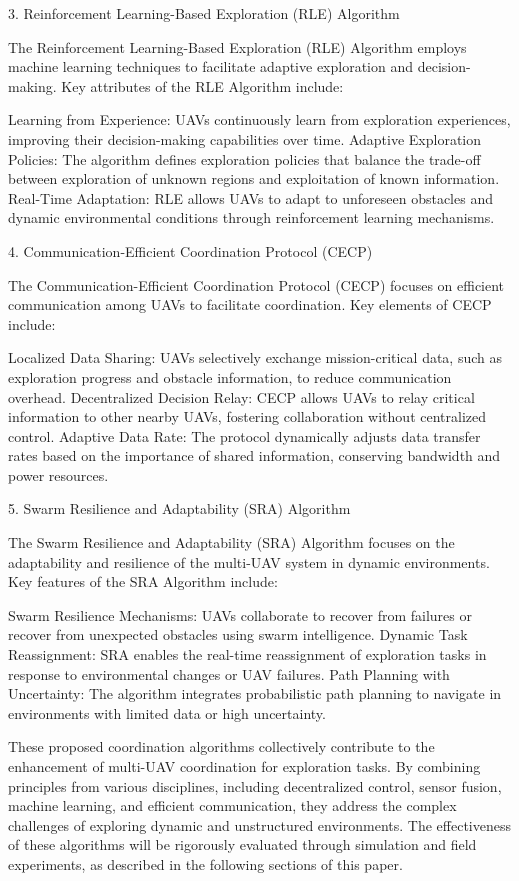 \documentclass[sigconf]{acmart}
\begin{document}
3. Reinforcement Learning-Based Exploration (RLE) Algorithm

The Reinforcement Learning-Based Exploration (RLE) Algorithm employs machine learning techniques to facilitate adaptive exploration and decision-making. Key attributes of the RLE Algorithm include:

    Learning from Experience: UAVs continuously learn from exploration experiences, improving their decision-making capabilities over time.
    Adaptive Exploration Policies: The algorithm defines exploration policies that balance the trade-off between exploration of unknown regions and exploitation of known information.
    Real-Time Adaptation: RLE allows UAVs to adapt to unforeseen obstacles and dynamic environmental conditions through reinforcement learning mechanisms.

4. Communication-Efficient Coordination Protocol (CECP)

The Communication-Efficient Coordination Protocol (CECP) focuses on efficient communication among UAVs to facilitate coordination. Key elements of CECP include:

    Localized Data Sharing: UAVs selectively exchange mission-critical data, such as exploration progress and obstacle information, to reduce communication overhead.
    Decentralized Decision Relay: CECP allows UAVs to relay critical information to other nearby UAVs, fostering collaboration without centralized control.
    Adaptive Data Rate: The protocol dynamically adjusts data transfer rates based on the importance of shared information, conserving bandwidth and power resources.

5. Swarm Resilience and Adaptability (SRA) Algorithm

The Swarm Resilience and Adaptability (SRA) Algorithm focuses on the adaptability and resilience of the multi-UAV system in dynamic environments. Key features of the SRA Algorithm include:

    Swarm Resilience Mechanisms: UAVs collaborate to recover from failures or recover from unexpected obstacles using swarm intelligence.
    Dynamic Task Reassignment: SRA enables the real-time reassignment of exploration tasks in response to environmental changes or UAV failures.
    Path Planning with Uncertainty: The algorithm integrates probabilistic path planning to navigate in environments with limited data or high uncertainty.

These proposed coordination algorithms collectively contribute to the enhancement of multi-UAV coordination for exploration tasks. By combining principles from various disciplines, including decentralized control, sensor fusion, machine learning, and efficient communication, they address the complex challenges of exploring dynamic and unstructured environments. The effectiveness of these algorithms will be rigorously evaluated through simulation and field experiments, as described in the following sections of this paper.
\end{document}
